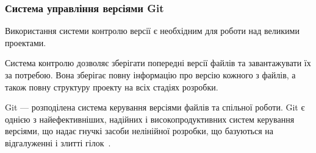 \subsubsection{Система управління версіями Git}
Використання системи контролю версії є необхідним для роботи над великими проектами.

Система контролю дозволяє зберігати попередні версії файлів та завантажувати їх за потребою. 
Вона зберігає повну інформацію про версію кожного з файлів, а також повну структуру проекту на всіх стадіях розробки.

Git --- розподілена система керування версіями файлів та спільної роботи.
Git є однією з найефективніших, надійних і високопродуктивних систем керування версіями, що надає гнучкі засоби нелінійної розробки, що базуються на відгалуженні і злитті гілок~\cite{Chacon2009}.
